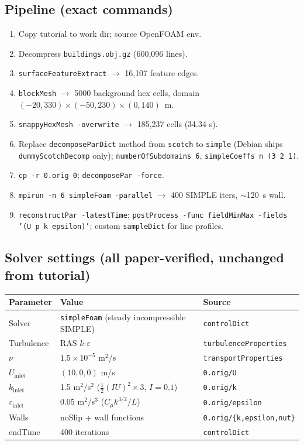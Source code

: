 \documentclass[11pt,a4paper]{article}
\begin{document}
\subsection{Pipeline (exact commands)}
\begin{enumerate}[nosep]
  \item Copy tutorial to work dir; source OpenFOAM env.
  \item Decompress \texttt{buildings.obj.gz} (600{,}096 lines).
  \item \texttt{surfaceFeatureExtract} $\to$ 16{,}107 feature edges.
  \item \texttt{blockMesh} $\to$ 5000 background hex cells, domain
        $(-20,330)\times(-50,230)\times(0,140)$~m.
  \item \texttt{snappyHexMesh -overwrite} $\to$ 185{,}237 cells (34.34 s).
  \item Replace \texttt{decomposeParDict} method from \texttt{scotch} to
        \texttt{simple} (Debian ships \texttt{dummyScotchDecomp} only);
        \texttt{numberOfSubdomains 6}, \texttt{simpleCoeffs n (3 2 1)}.
  \item \texttt{cp -r 0.orig 0}; \texttt{decomposePar -force}.
  \item \texttt{mpirun -n 6 simpleFoam -parallel} $\to$ 400 SIMPLE iters,
        $\sim$120~s wall.
  \item \texttt{reconstructPar -latestTime}; \texttt{postProcess -func
        fieldMinMax -fields '(U p k epsilon)'}; custom \texttt{sampleDict}
        for line profiles.
\end{enumerate}

\subsection{Solver settings (all paper-verified, unchanged from tutorial)}
\begin{center}\small
\begin{tabular}{@{}lll@{}}
\toprule
Parameter & Value & Source \\
\midrule
Solver & \texttt{simpleFoam} (steady incompressible SIMPLE) & \texttt{controlDict} \\
Turbulence & RAS $k$-$\varepsilon$ & \texttt{turbulenceProperties} \\
$\nu$ & $1.5\times10^{-5}$ m$^2$/s & \texttt{transportProperties} \\
$U_\text{inlet}$ & $(10,0,0)$ m/s & \texttt{0.orig/U} \\
$k_\text{inlet}$ & 1.5 m$^2$/s$^2$ ($\tfrac{1}{2}(IU)^2 \times 3$, $I=0.1$) & \texttt{0.orig/k} \\
$\varepsilon_\text{inlet}$ & 0.05 m$^2$/s$^3$ ($C_\mu k^{3/2}/L$) & \texttt{0.orig/epsilon} \\
Walls & noSlip + wall functions & \texttt{0.orig/\{k,epsilon,nut\}} \\
endTime & 400 iterations & \texttt{controlDict} \\
\bottomrule
\end{tabular}
\end{center}
\end{document}
